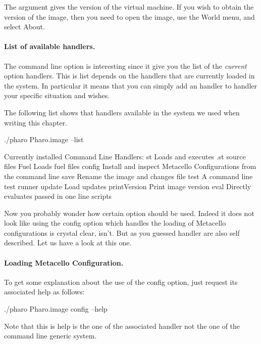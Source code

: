 \documentclass[a4paper,10pt,twoside]{book}
\begin{document}
The  argument gives the version of the virtual machine. If you wish to obtain the version of the image, then you need to open the image, use the World menu, and select About.

\paragraph{List of available handlers.} The command line option  is interesting since it give you the list of the \emph{current} option handlers. This is list depends on the handlers that are currently loaded in the system. In particular it means that you can simply add an handler to handler your specific situation and wishes.

The following list shows that handlers available in the system we used when writing this chapter.

\begin{code}{}
./pharo Pharo.image --list

Currently installed Command Line Handlers:
    st              Loads and executes .st source files
    Fuel            Loads fuel files
    config          Install and inspect Metacello Configurations from the command line
    save            Rename the image and changes file
    test            A command line test runner
    update          Load updates
    printVersion    Print image version
    eval            Directly evaluates passed in one line scripts
\end{code}

Now you probably wonder how certain option should be used. Indeed it does not look like using the config option which handles the loading of Metacello configurations is crystal clear, isn't. But as you guessed handler are also self described. Let us have a look at this one. 



\paragraph{Loading Metacello Configuration.}
To get some explanation about the use of the config option, just request its associated help as follows: 

\begin{code}{}
./pharo Pharo.image config --help
\end{code}

Note that this is help is the one of the associated handler not the one of the command line generic system. 
\end{document}
